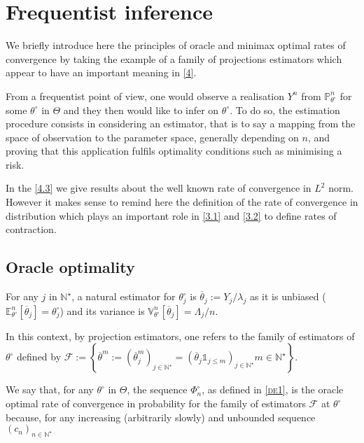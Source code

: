 \section{Frequentist inference}\label{2}
We briefly introduce here the principles of oracle and minimax optimal rates of convergence by taking the example of a family of projections estimators which appear to have an important meaning in \textsc{\cref{4}}.

From a frequentist point of view, one would observe a realisation $Y^{n}$ from $\mathds{P}_{\theta^{\circ}}^{n}$ for some $\theta^{\circ}$ in $\Theta$ and they then would like to infer on $\theta^{\circ}$.
To do so, the estimation procedure consists in considering an estimator, that is to say a mapping from the space of observation to the parameter space, generally depending on $n$, and proving that this application fulfils optimality conditions such as minimising a risk.

In the \textsc{\cref{4.3}} we give results about the well known rate of convergence in $L^{2}$ norm.
However it makes sense to remind here the definition of the rate of convergence in distribution which plays an important role in \textsc{\cref{3.1}} and \textsc{\cref{3.2}} to define rates of contraction.

\subsection{Oracle optimality}\label{2.1}
For any $j$ in $\mathds{N}^{\star}$, a natural estimator for $\theta^{\circ}_{j}$ is $\overline{\theta}_{j} := Y_{j}/\lambda_{j}$ as it is unbiased ($\mathds{E}_{\theta^{\circ}}^{n}\left[\overline{\theta}_{j}\right] = \theta^{\circ}_{j}$) and its variance is $\mathds{V}_{\theta^{\circ}}^{n}\left[\overline{\theta}_{j}\right] = \Lambda_{j}/n$.

In this context, by projection estimators, one refers to the family of estimators of $\theta^{\circ}$ defined by $\mathcal{F}:=\left\{\overline{\theta}^{m} := \left(\overline{\theta}^{m}_{j}\right)_{j \in \mathds{N}^{\star}} = \left(\overline{\theta}_{j} \mathds{1}_{j \leq m}\right)_{j \in \mathds{N}^{\star}} m \in \mathds{N}^{\star}\right\}$.

\medskip

We say that, for any $\theta^{\circ}$ in $\Theta$, the sequence $\Phi_{n}^{\circ}$, as defined in \textsc{\cref{de1}}, is the oracle optimal rate of convergence in probability for the family of estimators $\mathcal{F}$ at $\theta^{\circ}$ because, for any increasing (arbitrarily slowly) and unbounded sequence $(c_{n})_{n \in \mathds{N}^{\star}}$

